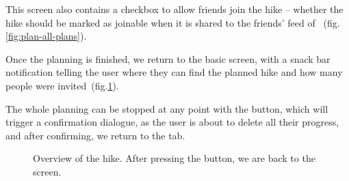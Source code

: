 This screen also contains a checkbox to allow friends join the hike -- whether the hike should be marked as joinable when it is shared to the friends' feed of ~(fig.\ref{fig:plan-all-plans}).

Once the planning is finished, we return to the basic  screen, with a snack bar notification telling the user where they can find the planned hike and how many people were invited~(fig.\ref{fig:plan-end}).

The whole planning can be stopped at any point with the  button, which will trigger a confirmation dialogue, as the user is about to delete all their progress, and after confirming, we return to the  tab.

\begin{figure}[h!]
    \centering
    \hfill
    \hfill
    \caption{Overview of the hike. After pressing the  button, we are back to the  screen.}
    \label{fig:plan-end}
\end{figure}

